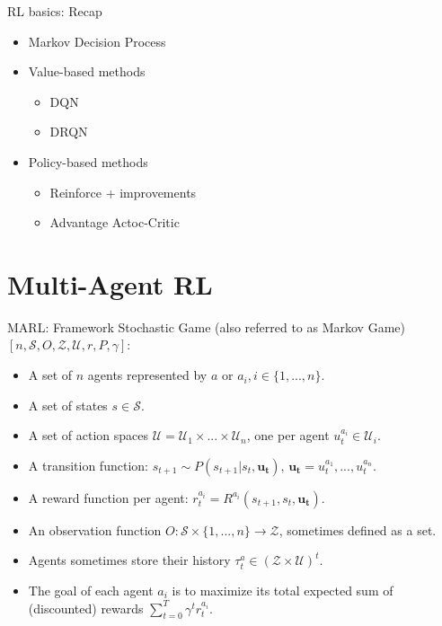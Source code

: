 \documentclass[9pt, hyperref={pdfusetitle,colorlinks=true,allcolors=DarkBlue}]{beamer}
\begin{document}
\begin{frame}{RL basics: Recap}

    

\begin{itemize}
    \item Markov Decision Process
    \vfill
    \item Value-based methods
        \begin{itemize}
        \item DQN
        \item DRQN
        \end{itemize}{}
    \vfill
    \item Policy-based methods
        \begin{itemize}
        \item Reinforce + improvements
        \item Advantage Actoc-Critic
        \end{itemize}{}
    \vfill
\end{itemize}{}

\end{frame}

\section{Multi-Agent RL}
\begin{frame}{MARL: Framework}
    Stochastic Game (also referred to as Markov Game) $[n, \mathcal{S}, O, \mathcal{Z}, \mathcal{U}, r, P, \gamma]$:
    \vfill
    \begin{itemize}
        \item A set of $n$ agents represented by $a$ or $a_i, i \in  \{1,...,n\}$.
        \vfill
        \item A set of states $s \in \mathcal{S}$.
        \vfill
        \item A set of action spaces $\mathcal{U}=\mathcal{U}_1 \times ... \times \mathcal{U}_n$, one per agent $u^{a_i}_{t} \in \mathcal{U}_i$.
        \vfill
        \item A transition function: $s_{t+1} \sim P(s_{t+1} | s_t, \boldsymbol{u_t})$, $\boldsymbol{u_t}= u^{a_1}_t, ..., u^{a_n}_t$.
        \vfill
        \item A reward function per agent:  $r^{a_i}_t = R^{a_i}(s_{t+1}, s_t, \boldsymbol{u_t})$.
        \vfill
        \item An observation function $O:\mathcal{S} \times \{1,...,n\} \rightarrow \mathcal{Z}$, sometimes defined as a set.
        \vfill
        \item Agents sometimes store their history $\tau^a_t \in (\mathcal{Z} \times \mathcal{U})^t$.
        \vfill
        \item The goal of each agent $a_i$ is to maximize its total expected sum of (discounted) rewards $\sum_{t=0}^{T} \gamma^t r^{a_i}_t$.
    \end{itemize}{}
\end{frame}
\end{document}
